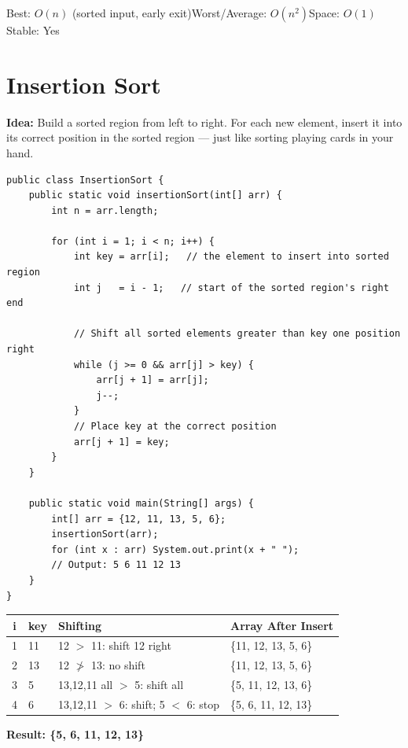 \documentclass[12pt,a4paper,oneside]{book}
\begin{document}
\begin{complexity}
Best: $O(n)$ (sorted input, early exit)\quad Worst/Average: $O(n^2)$\quad Space: $O(1)$\quad Stable: Yes
\end{complexity}

\section{Insertion Sort}

\textbf{Idea:} Build a sorted region from left to right. For each new element, insert it into its correct position in the sorted region --- just like sorting playing cards in your hand.

\begin{lstlisting}[caption={Insertion Sort}]
public class InsertionSort {
    public static void insertionSort(int[] arr) {
        int n = arr.length;

        for (int i = 1; i < n; i++) {
            int key = arr[i];   // the element to insert into sorted region
            int j   = i - 1;   // start of the sorted region's right end

            // Shift all sorted elements greater than key one position right
            while (j >= 0 && arr[j] > key) {
                arr[j + 1] = arr[j];
                j--;
            }
            // Place key at the correct position
            arr[j + 1] = key;
        }
    }

    public static void main(String[] args) {
        int[] arr = {12, 11, 13, 5, 6};
        insertionSort(arr);
        for (int x : arr) System.out.print(x + " ");
        // Output: 5 6 11 12 13
    }
}
\end{lstlisting}

\begin{dryrun}[Dry Run: arr = \{12, 11, 13, 5, 6\}]
\begin{center}
\begin{tabular}{clll}
\toprule
\textbf{i} & \textbf{key} & \textbf{Shifting} & \textbf{Array After Insert}\\
\midrule
1 & 11 & 12 $>$ 11: shift 12 right         & \{11, 12, 13, 5, 6\}\\
2 & 13 & 12 $\not>$ 13: no shift           & \{11, 12, 13, 5, 6\}\\
3 & 5  & 13,12,11 all $>$ 5: shift all     & \{5, 11, 12, 13, 6\}\\
4 & 6  & 13,12,11 $>$ 6: shift; 5 $<$ 6: stop & \{5, 6, 11, 12, 13\}\\
\bottomrule
\end{tabular}
\end{center}
\textbf{Result: \{5, 6, 11, 12, 13\}}
\end{dryrun}
\end{document}

